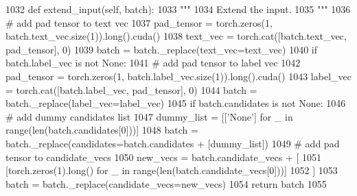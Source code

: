 \begin{DoxyCode}
1032     \textcolor{keyword}{def }extend\_input(self, batch):
1033         \textcolor{stringliteral}{"""}
1034 \textcolor{stringliteral}{        Extend the input.}
1035 \textcolor{stringliteral}{        """}
1036         \textcolor{comment}{# add pad tensor to text vec}
1037         pad\_tensor = torch.zeros(1, batch.text\_vec.size(1)).long().cuda()
1038         text\_vec = torch.cat([batch.text\_vec, pad\_tensor], 0)
1039         batch = batch.\_replace(text\_vec=text\_vec)
1040         \textcolor{keywordflow}{if} batch.label\_vec \textcolor{keywordflow}{is} \textcolor{keywordflow}{not} \textcolor{keywordtype}{None}:
1041             \textcolor{comment}{# add pad tensor to label vec}
1042             pad\_tensor = torch.zeros(1, batch.label\_vec.size(1)).long().cuda()
1043             label\_vec = torch.cat([batch.label\_vec, pad\_tensor], 0)
1044             batch = batch.\_replace(label\_vec=label\_vec)
1045         \textcolor{keywordflow}{if} batch.candidates \textcolor{keywordflow}{is} \textcolor{keywordflow}{not} \textcolor{keywordtype}{None}:
1046             \textcolor{comment}{# add dummy candidates list}
1047             dummy\_list = [[\textcolor{stringliteral}{'None'}] \textcolor{keywordflow}{for} \_ \textcolor{keywordflow}{in} range(len(batch.candidates[0]))]
1048             batch = batch.\_replace(candidates=batch.candidates + [dummy\_list])
1049             \textcolor{comment}{# add pad tensor to candidate\_vecs}
1050             new\_vecs = batch.candidate\_vecs + [
1051                 [torch.zeros(1).long() \textcolor{keywordflow}{for} \_ \textcolor{keywordflow}{in} range(len(batch.candidate\_vecs[0]))]
1052             ]
1053             batch = batch.\_replace(candidate\_vecs=new\_vecs)
1054         \textcolor{keywordflow}{return} batch
1055 
\end{DoxyCode}
\mbox{\label{classprojects_1_1controllable__dialogue_1_1controllable__seq2seq_1_1controllable__seq2seq_1_1ControllableSeq2seqAgent_ac416a9eb7ee7b0b1984468a4ec0b057c}} 
